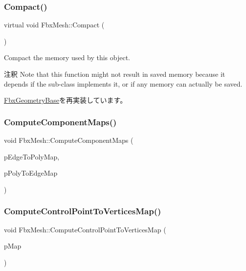 \subsubsection{\texorpdfstring{Compact()}{Compact()}}
{\footnotesize\ttfamily virtual void Fbx\+Mesh\+::\+Compact (\begin{DoxyParamCaption}{ }\end{DoxyParamCaption})\hspace{0.3cm}{\ttfamily [virtual]}}

Compact the memory used by this object. \begin{DoxyRemark}{注釈}
Note that this function might not result in saved memory because it depends if the sub-\/class implements it, or if any memory can actually be saved. 
\end{DoxyRemark}


\hyperlink{class_fbx_geometry_base_a66146155ecad4e6f6f2e8cf52e0340f6}{Fbx\+Geometry\+Base}を再実装しています。

\mbox{\label{class_fbx_mesh_add00ef9f41759119264e83765697564e}} 
\subsubsection{\texorpdfstring{Compute\+Component\+Maps()}{ComputeComponentMaps()}}
{\footnotesize\ttfamily void Fbx\+Mesh\+::\+Compute\+Component\+Maps (\begin{DoxyParamCaption}\item[{\hyperlink{struct_fbx_mesh_1_1_component_map}{Component\+Map} \&}]{p\+Edge\+To\+Poly\+Map,  }\item[{\hyperlink{struct_fbx_mesh_1_1_component_map}{Component\+Map} \&}]{p\+Poly\+To\+Edge\+Map }\end{DoxyParamCaption})}

\mbox{\label{class_fbx_mesh_a6e64bf4157a20a29bf548be6dd8d90df}} 
\subsubsection{\texorpdfstring{Compute\+Control\+Point\+To\+Vertices\+Map()}{ComputeControlPointToVerticesMap()}}
{\footnotesize\ttfamily void Fbx\+Mesh\+::\+Compute\+Control\+Point\+To\+Vertices\+Map (\begin{DoxyParamCaption}\item[{\hyperlink{class_fbx_mesh_1_1_control_point_to_vertices_map}{Control\+Point\+To\+Vertices\+Map} \&}]{p\+Map }\end{DoxyParamCaption})}

